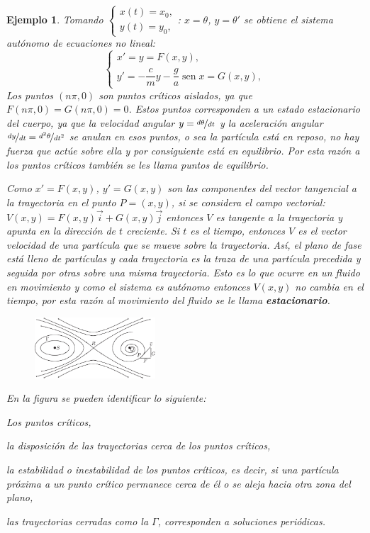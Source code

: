 \documentclass[a5paper,doc,10pt,noapacite]{apa6}
\DeclareMathOperator{\sen}{sen}
\newtheorem{ejem}{Ejemplo}
\begin{document}
{{\begin{ejem}
	Tomando \(
			\begin{cases}
			x(t) = x_0,
			 \\
			y(t) = y_0,
			\end{cases}
		\)\hspace{-1em}: \(x=\theta\), \(y=\theta'\) se obtiene el sistema autónomo de ecuaciones no lineal:
	\[
		\begin{cases}
			x' = y = F(x,y),
			 \\
			y' = -\dfrac{c}{m}y-\dfrac{g}{a}\sen x=G(x,y),
			\end{cases}
	\]
	Los puntos \((n\pi,0)\) son puntos críticos aislados, ya que  \(F(n\pi,0)=G(n\pi,0)=0\). Estos puntos corresponden a un estado estacionario del cuerpo, ya que la velocidad angular \(y=\nicefrac{d\theta}{dt}\) y la aceleración angular \(\nicefrac{dy}{dt}=\nicefrac{d^2\theta}{dt^2}\)  se anulan en esos puntos, o sea la partícula está en reposo, no hay fuerza que actúe sobre ella y por consiguiente está en equilibrio. Por esta razón a los puntos críticos también se les llama puntos de equilibrio.

	Como \(x'=F(x,y)\), \(y'=G(x,y)\) son las componentes del vector tangencial a la trayectoria en el punto \(P=(x,y)\), si se considera el campo vectorial: \(V(x,y)=F(x,y)\vec{i}+G(x,y)\vec{j}\) entonces \(V\) es tangente a la trayectoria y apunta en la dirección de \(t\) creciente. Si \(t\) es el tiempo, entonces \(V\) es el vector velocidad de una partícula que se mueve sobre la trayectoria. Así, el plano de fase está lleno de partículas y cada trayectoria es la traza de una partícula precedida y seguida por otras sobre una misma trayectoria. Esto es lo que ocurre en un fluido en movimiento y como el sistema es autónomo entonces \(V(x,y)\) no cambia en el tiempo, por esta razón al movimiento del fluido se le llama \emph{\textbf{estacionario}}.

	\begin{figure}[H]
		\captionsetup{justification=centering, labelfont=footnotesize, font=footnotesize}
		\centering
		\includegraphics[width=4.5cm]{Graficos/figura1}
		\caption{ }
		\label{fig:M-1}
	\end{figure}

	
En la figura se pueden identificar lo siguiente:
	\begin{APAenumerate}
		\item Los puntos críticos,
		\item la disposición de las trayectorias cerca de los puntos críticos,
		\item la estabilidad o inestabilidad de los puntos críticos, es decir, si una partícula próxima a un punto crítico permanece cerca de él o se aleja hacia otra zona del plano,
		\item las trayectorias cerradas como la \(\Gamma\), corresponden a soluciones periódicas.
	\end{APAenumerate}


\end{ejem}}}
\end{document}
